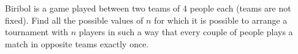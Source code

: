 Biribol is a game played between two teams of 4 people each (teams are not fixed). Find all the possible values of $ n$ for which it is possible to arrange a tournament with $ n$ players in such a way that every couple of people plays a match in opposite teams exactly once.